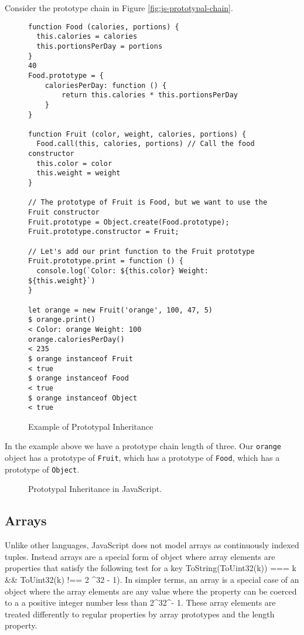 \documentclass[]{final_report}
\begin{document}
Consider the prototype chain in Figure \ref{fig:js-prototypal-chain}.

\begin{figure}[h]
\begin{verbatim}
function Food (calories, portions) {
  this.calories = calories
  this.portionsPerDay = portions
}
40
Food.prototype = {
	caloriesPerDay: function () {
		return this.calories * this.portionsPerDay
	}
}

function Fruit (color, weight, calories, portions) {
  Food.call(this, calories, portions) // Call the food constructor
  this.color = color
  this.weight = weight
}

// The prototype of Fruit is Food, but we want to use the Fruit constructor
Fruit.prototype = Object.create(Food.prototype);
Fruit.prototype.constructor = Fruit;

// Let's add our print function to the Fruit prototype
Fruit.prototype.print = function () {
  console.log(`Color: ${this.color} Weight: ${this.weight}`)
}

let orange = new Fruit('orange', 100, 47, 5)
$ orange.print()
< Color: orange Weight: 100
orange.caloriesPerDay()
< 235
$ orange instanceof Fruit
< true
$ orange instanceof Food
< true
$ orange instanceof Object
< true
\end{verbatim}
\caption{\label{fig:js-prototypical-inheritance} Example of Prototypal Inheritance}
\end{figure} 

In the example above we have a prototype chain length of three. Our \lstinline{orange} object has a prototype of \lstinline{Fruit}, which has a prototype of \lstinline{Food}, which has a prototype of \lstinline{Object}.

\begin{figure}[h]
\centering
\fboxsep 2mm
\caption{\label{fig:fig:js-prototypal-chain} Prototypal Inheritance in JavaScript.}
\end{figure} 

\subsection{Arrays}
Unlike other languages, JavaScript does not model arrays as continuously indexed tuples. Instead arrays are a special form of object where array elements are properties that satisfy the following test for a key ToString(ToUint32(k)) === k \&\& ToUint32(k) !== 2 \textasciicircum 32 - 1). In simpler terms, an array is a special case of an object where the array elements are any value where the property can be coerced to a a positive integer number less than 2\textasciicircum32\textasciicircum - 1. These array elements are treated differently to regular properties by array prototypes and the length property. 
\end{document}
